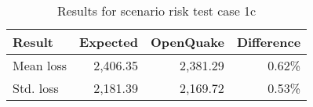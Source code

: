 \begin{table}[htbp]

\centering
\begin{tabular}{ l r r r }

\hline
\rowcolor{anti-flashwhite}
\bf{Result} & \bf{Expected} & \bf{OpenQuake} & \bf{Difference}\\
\hline
Mean loss & 2,406.35 & 2,381.29 & 0.62\% \\
Std. loss & 2,181.39 & 2,169.72 & 0.53\% \\
\hline
\end{tabular}

\caption{Results for scenario risk test case 1c}
\label{tab:result-scenario-risk-1c}
\end{table}